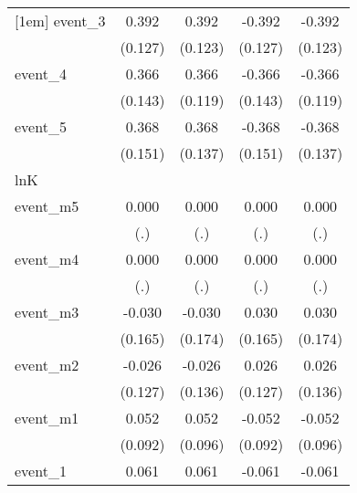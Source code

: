 {\begin{tabular}{l*{4}{c}}
[1em]
event\_3     &       0.392\sym{**} &       0.392\sym{**} &      -0.392\sym{**} &      -0.392\sym{**} \\
            &     (0.127)         &     (0.123)         &     (0.127)         &     (0.123)         \\
[1em]
event\_4     &       0.366\sym{*}  &       0.366\sym{**} &      -0.366\sym{*}  &      -0.366\sym{**} \\
            &     (0.143)         &     (0.119)         &     (0.143)         &     (0.119)         \\
[1em]
event\_5     &       0.368\sym{*}  &       0.368\sym{**} &      -0.368\sym{*}  &      -0.368\sym{**} \\
            &     (0.151)         &     (0.137)         &     (0.151)         &     (0.137)         \\
\hline
lnK         &                     &                     &                     &                     \\
event\_m5    &       0.000         &       0.000         &       0.000         &       0.000         \\
            &         (.)         &         (.)         &         (.)         &         (.)         \\
[1em]
event\_m4    &       0.000         &       0.000         &       0.000         &       0.000         \\
            &         (.)         &         (.)         &         (.)         &         (.)         \\
[1em]
event\_m3    &      -0.030         &      -0.030         &       0.030         &       0.030         \\
            &     (0.165)         &     (0.174)         &     (0.165)         &     (0.174)         \\
[1em]
event\_m2    &      -0.026         &      -0.026         &       0.026         &       0.026         \\
            &     (0.127)         &     (0.136)         &     (0.127)         &     (0.136)         \\
[1em]
event\_m1    &       0.052         &       0.052         &      -0.052         &      -0.052         \\
            &     (0.092)         &     (0.096)         &     (0.092)         &     (0.096)         \\
[1em]
event\_1     &       0.061         &       0.061         &      -0.061         &      -0.061         \\

\end{tabular}}
